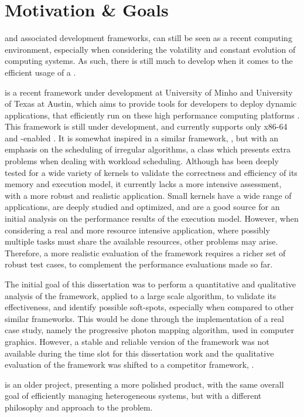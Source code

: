 \documentclass[main.tex]{subfiles}
\begin{document}
\section{Motivation \& Goals}

\hetplats and associated development frameworks, can still be seen as a recent computing environment, especially when considering the volatility and constant evolution of computing systems. As such, there is still much to develop when it comes to the efficient usage of a \hetplat.

\gama is a recent framework under development at University of Minho and University of Texas at Austin, which aims to provide tools for developers to deploy dynamic applications, that efficiently run on these high performance computing platforms \cite{joao2012gama}.
This framework is still under development, and currently supports only x86-64 \cpus and \cuda-enabled \gpus. It is somewhat inspired in a similar framework, \starpu, but with an emphasis on the scheduling of irregular algorithms, a class which presents extra problems when dealing with workload scheduling. Although \gama has been deeply tested for a wide variety of kernels to validate the correctness and efficiency of its memory and execution model, it currently lacks a more intensive assessment, with a more robust and realistic application.
Small kernels have a wide range of applications, are deeply studied and optimized, and are a good source for an initial analysis on the performance results of the execution model. However, when considering a real and more resource intensive application, where possibly multiple tasks must share the available resources, other problems may arise. Therefore, a more realistic evaluation of the framework requires a richer set of robust test cases, to complement the performance evaluations made so far.

The initial goal of this dissertation was to perform a quantitative and qualitative analysis of the \gama framework, applied to a large scale algorithm, to validate its effectiveness, and identify possible soft-spots, especially when compared to other similar frameworks. This would be done through the implementation of a real case study, namely the progressive photon mapping algorithm, used in computer graphics.
However, a stable and reliable version of the \gama framework was not available during the time slot for this dissertation work and the qualitative evaluation of the framework was shifted to a competitor framework, \starpu.

\starpu is an older project, presenting a more polished product, with the same overall goal of efficiently managing heterogeneous systems, but with a different philosophy and approach to the problem.
\end{document}
